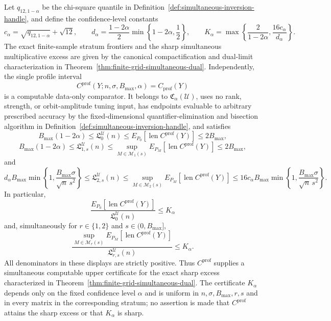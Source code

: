 Let \(q_{12,1-\alpha}\) be the chi-square quantile in Definition~\ref{def:simultaneous-inversion-handle}, and define the confidence-level constants
\[
 c_\alpha=\sqrt{q_{12,1-\alpha}}+\sqrt{12},\qquad
 d_\alpha=\frac{1-2\alpha}{2}\min\left\{1-2\alpha,\frac12\right\},
 \qquad
 K_\alpha=\max\left\{\frac{2}{1-2\alpha},\frac{16c_\alpha}{d_\alpha}\right\}.
\]
The exact finite-sample stratum frontiers and the sharp simultaneous multiplicative excess are given by the canonical compactification and dual-limit characterization in Theorem~\ref{thm:finite-grid-simultaneous-dual}.  Independently, the single profile interval
\[
 C^{\mathrm{prof}}(Y;n,\sigma,B_{\max},\alpha)=C_{\mathrm{prof}}(Y)
\]
is a computable data-only comparator.  It belongs to \(\mathfrak C_\alpha(\mathcal U)\), uses no rank, strength, or orbit-amplitude tuning input, has endpoints evaluable to arbitrary prescribed accuracy by the fixed-dimensional quantifier-elimination and bisection algorithm in Definition~\ref{def:simultaneous-inversion-handle}, and satisfies
\[
 B_{\max}(1-2\alpha)\leq\mathfrak L_0^{\mathcal U}(n)
 \leq E_{P_0}[\operatorname{len}C^{\mathrm{prof}}(Y)]\leq2B_{\max},
\]
\[
 B_{\max}(1-2\alpha)\leq\mathfrak L_{1,s}^{\mathcal U}(n)
 \leq\sup_{M\in\mathcal M_1(s)}E_{P_M}[\operatorname{len}C^{\mathrm{prof}}(Y)]
 \leq2B_{\max},
\]
and
\[
 d_\alpha B_{\max}\min\left\{1,\frac{B_{\max}\sigma}{\sqrt n\,s^2}\right\}
 \leq\mathfrak L_{2,s}^{\mathcal U}(n)
 \leq\sup_{M\in\mathcal M_2(s)}E_{P_M}[\operatorname{len}C^{\mathrm{prof}}(Y)]
 \leq16c_\alpha B_{\max}\min\left\{1,\frac{B_{\max}\sigma}{\sqrt n\,s^2}\right\}.
\]
In particular,
\[
 \frac{E_{P_0}[\operatorname{len}C^{\mathrm{prof}}(Y)]}{\mathfrak L_0^{\mathcal U}(n)}\leq K_\alpha
\]
and, simultaneously for \(r\in\{1,2\}\) and \(s\in(0,B_{\max}]\),
\[
 \frac{\sup_{M\in\mathcal M_r(s)}E_{P_M}[\operatorname{len}C^{\mathrm{prof}}(Y)]}
 {\mathfrak L_{r,s}^{\mathcal U}(n)}\leq K_\alpha.
\]
All denominators in these displays are strictly positive.  Thus \(C^{\mathrm{prof}}\) supplies a simultaneous computable upper certificate for the exact sharp excess characterized in Theorem~\ref{thm:finite-grid-simultaneous-dual}.  The certificate \(K_\alpha\) depends only on the fixed confidence level \(\alpha\) and is uniform in \(n,\sigma,B_{\max},r,s\) and in every matrix in the corresponding stratum; no assertion is made that \(C^{\mathrm{prof}}\) attains the sharp excess or that \(K_\alpha\) is sharp.
